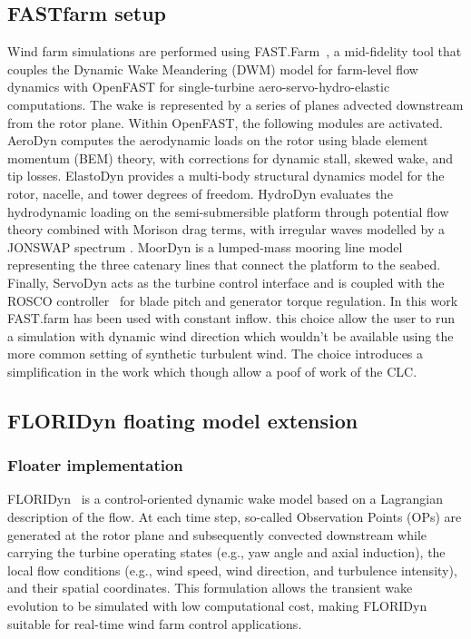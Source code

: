 \documentclass[final,5p,times,twocolumn]{elsarticle}
\begin{document}
\subsection{FASTfarm setup}
\label{FASTfarm_setup}
Wind farm simulations are performed using FAST.Farm~\cite{jonkman2021fast}, 
a mid-fidelity tool that couples the Dynamic Wake Meandering (DWM) \cite{Dynamic_wake_meandering} model for farm-level flow dynamics with OpenFAST \cite{openFAST} for single-turbine aero-servo-hydro-elastic computations. The wake is represented by a series of planes advected downstream from the rotor plane.
Within OpenFAST, the following modules are activated. AeroDyn computes the aerodynamic loads on the rotor using blade element momentum (BEM) theory, with corrections for dynamic stall, skewed wake, and tip losses. ElastoDyn provides a multi-body structural dynamics model for the rotor, nacelle, and tower degrees of freedom. HydroDyn evaluates the hydrodynamic loading on the semi-submersible platform through potential flow theory combined with Morison drag terms, with irregular waves modelled by a JONSWAP spectrum \cite{JONSWAP_spectra}. MoorDyn is a lumped-mass mooring line model representing the three catenary lines that connect the platform to the seabed. Finally, ServoDyn acts as the turbine control interface and is coupled with the ROSCO controller~\cite{rosco} for blade pitch and generator torque regulation.
In this work FAST.farm has been used with constant inflow. this choice allow the user to run a simulation with dynamic wind direction which wouldn't be available using the more common setting of synthetic turbulent wind. The choice introduces a simplification in the work which though allow a poof of work of the CLC.


\subsection{FLORIDyn floating model extension}
\label{FLORIDyn_extension}

\subsubsection{Floater implementation}
\label{Floater_implementation}

FLORIDyn~\cite{Becker_2022} is a control-oriented dynamic wake model based on a Lagrangian description of the flow. At each time step, so-called Observation Points (OPs) are generated at the rotor plane and subsequently convected downstream while carrying the turbine operating states (e.g., yaw angle and axial induction), the local flow conditions (e.g., wind speed, wind direction, and turbulence intensity), and their spatial coordinates. This formulation allows the transient wake evolution to be simulated with low computational cost, making FLORIDyn suitable for real-time wind farm control applications.
\end{document}
